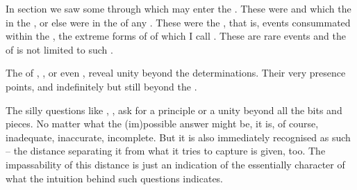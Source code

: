 {\pa\label{pa:manifest4} \imm
In section  we saw some  through 
which  may enter the . 
These were  and  which  
the  in the , or else 
were  in the  of any . These were the 
, that is, events consummated within the \hoa, the extreme 
forms of  of  which I call 
. These are rare events and the  of 
 is not limited to such .


\pa\label{pa:manifest3} \act  
The  of , ,  or 
even , reveal unity beyond the  
determinations. Their very presence points,  and 
indefinitely but still beyond the \hoa. 

The silly questions like , 
,  ask for a principle or a unity beyond all the bits and 
pieces. 
No matter what the (im)possible answer might be, it is, of
course, inadequate, inaccurate, incomplete.  But it is also
immediately recognised as such -- the distance separating it
from what it tries to capture is given, too.  The impassability of
this distance is just an indication of the essentially 
character of what the  intuition behind such questions 
indicates.

}
